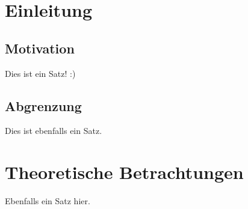 \documentclass[a4paper, 11pt]{article}
\begin{document}
\tableofcontents

\newpage

\section{Einleitung}

\subsection{Motivation}
Dies ist ein Satz! :)

\subsection{Abgrenzung}
Dies ist ebenfalls ein Satz.

\newpage

\section{Theoretische Betrachtungen}
Ebenfalls ein Satz hier.
\end{document}
